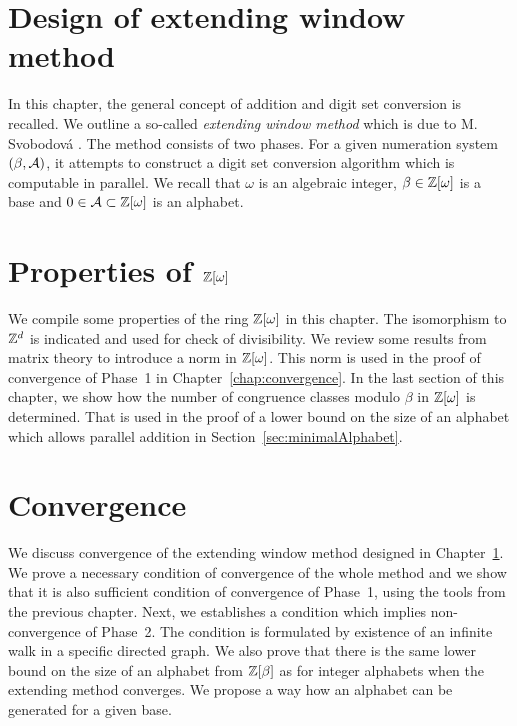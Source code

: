 \chapter{Design of extending window method}
\label{chap:ewm}
In this chapter, the general concept of addition and digit set conversion is recalled. We outline a so-called \emph{extending window method} which is due to M. Svobodov\'a \cite{milena}. The method consists of two phases. For a given numeration system $(\beta,\mathcal{A})$, it attempts to construct a digit set conversion algorithm which is computable in parallel. We recall that $\omega$ is an algebraic integer, $\beta \in \mathbb{Z}[\omega]$ is a base and $0\in\mathcal{A}\subset\mathbb{Z}[\omega]$ is an alphabet. 


	

\chapter{\texorpdfstring{Properties of $\mathbb{Z}[\omega]$}{Properties of Z[omega]}}
\label{chap:Zomega}
We compile some properties  of the ring $\mathbb{Z}[\omega]$ in this chapter. The isomorphism to $\mathbb{Z}^d$ is indicated and used for check of divisibility.  We review some results from matrix theory to introduce a norm in $\mathbb{Z}[\omega]$. This norm is used in the proof of convergence of Phase~1 in Chapter~\ref{chap:convergence}. In the last section of this chapter, we show how the number of congruence classes modulo $\beta$ in $\mathbb{Z}[\omega]$ is determined. That is used in the proof of a lower bound on the size of an alphabet which allows parallel addition in Section~\ref{sec:minimalAlphabet}.
	
	
		
	
\chapter{Convergence}
We discuss convergence of the extending window method designed in Chapter~\ref{chap:ewm}. We prove a necessary condition of convergence of the whole method and we show that it is also sufficient condition of convergence of Phase~1, using the tools from the previous chapter. Next, we establishes a condition which implies non-convergence of Phase~2. The condition is formulated by existence of an infinite walk in a specific directed graph. We also prove that there is the same lower bound on the size of an alphabet from $\mathbb{Z}[\beta]$ as for integer alphabets when the extending method converges. We propose a way how an alphabet can be generated for a given base.
\label{chap:convergence}

